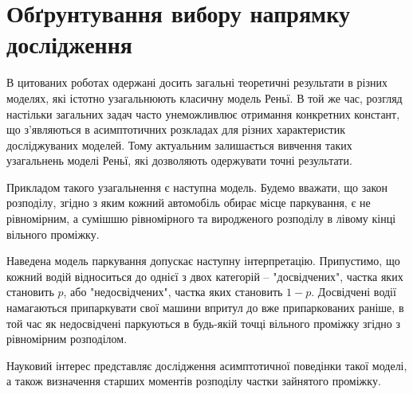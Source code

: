 \section{Обґрунтування вибору напрямку дослідження}

В цитованих роботах одержані досить загальні теоретичні результати в різних моделях, які істотно узагальнюють класичну модель Реньї. В той же час, розгляд настільки загальних задач часто унеможливлює отримання конкретних констант, що з’являються в асимптотичних розкладах для різних характеристик досліджуваних моделей. Тому актуальним залишається вивчення таких узагальнень моделі Реньї, які дозволяють одержувати точні результати.

Прикладом такого узагальнення є наступна модель. Будемо вважати, що закон розподілу, згідно з яким кожний автомобіль обирає місце паркування, є не рівномірним, а сумішшю рівномірного та виродженого розподілу в лівому кінці вільного проміжку.

Наведена модель паркування допускає наступну інтерпретацію. Припустимо, що кожний водій відноситься до однієї з двох категорій – "досвідчених", частка яких становить $p$, або "недосвідчених", частка яких становить $1 - p$. Досвідчені водії намагаються припаркувати свої машини впритул до вже припаркованих раніше, в той час як недосвідчені паркуються в будь-якій точці вільного проміжку згідно з рівномірним розподілом.

Науковий інтерес представляє дослідження асимптотичної поведінки такої моделі, а також визначення старших моментів розподілу частки зайнятого проміжку.

